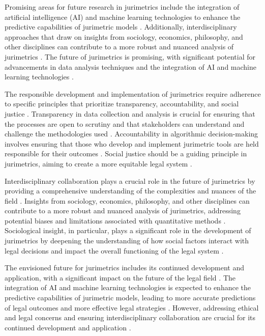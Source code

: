 Promising areas for future research in jurimetrics include the integration of artificial intelligence (AI) and machine learning technologies to enhance the predictive capabilities of jurimetric models \cite{silva2023role,nunes2016jurimetria}. Additionally, interdisciplinary approaches that draw on insights from sociology, economics, philosophy, and other disciplines can contribute to a more robust and nuanced analysis of jurimetrics \cite{silva2023role,nunes2016jurimetria}. The future of jurimetrics is promising, with significant potential for advancements in data analysis techniques and the integration of AI and machine learning technologies \cite{silva2023role,nunes2016jurimetria}.

The responsible development and implementation of jurimetrics require adherence to specific principles that prioritize transparency, accountability, and social justice \cite{10.1590/dados.2022.65.3.267,10.1007/978-3-319-44000-215}. Transparency in data collection and analysis is crucial for ensuring that the processes are open to scrutiny and that stakeholders can understand and challenge the methodologies used \cite{10.1590/dados.2022.65.3.267,10.1007/978-3-319-44000-215}. Accountability in algorithmic decision-making involves ensuring that those who develop and implement jurimetric tools are held responsible for their outcomes \cite{10.1590/dados.2022.65.3.267,10.1007/978-3-319-44000-215}. Social justice should be a guiding principle in jurimetrics, aiming to create a more equitable legal system \cite{10.1590/dados.2022.65.3.267,10.1007/978-3-319-44000-215}.

Interdisciplinary collaboration plays a crucial role in the future of jurimetrics by providing a comprehensive understanding of the complexities and nuances of the field \cite{silva2023role,nunes2016jurimetria}. Insights from sociology, economics, philosophy, and other disciplines can contribute to a more robust and nuanced analysis of jurimetrics, addressing potential biases and limitations associated with quantitative methods \cite{silva2023role,nunes2016jurimetria}. Sociological insight, in particular, plays a significant role in the development of jurimetrics by deepening the understanding of how social factors interact with legal decisions and impact the overall functioning of the legal system \cite{silva2023role,nunes2016jurimetria}.

The envisioned future for jurimetrics includes its continued development and application, with a significant impact on the future of the legal field \cite{silva2023role,nunes2016jurimetria}. The integration of AI and machine learning technologies is expected to enhance the predictive capabilities of jurimetric models, leading to more accurate predictions of legal outcomes and more effective legal strategies \cite{silva2023role,nunes2016jurimetria}. However, addressing ethical and legal concerns and ensuring interdisciplinary collaboration are crucial for its continued development and application \cite{silva2023role,nunes2016jurimetria}.


